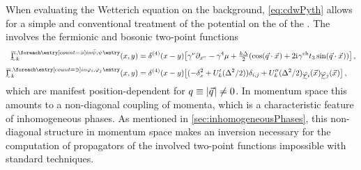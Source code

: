 When evaluating the Wetterich equation on the \cdw{} background, \cref{eq:cdwPyth} allows for a simple and conventional treatment of the \lpa{} potential on the \rhs{} of the \frgEquation{}.
The \rhs{} involves the fermionic and bosonic two-point functions
\begin{align}
	\FSvertexArg{\FSeaaEoMI}{\MFpsib, \MFpsi}(x,y)&=\delta^{(4)}(x-y)\big[\gamma^\nu\partial_{x^\nu}-\gamma^4\mu +\tfrac{h \Delta}{2}(\cos(\vec{q}\cdot\vec{x}\vts) +2\iu  \gammach t_3 \sin(\vec{q}\cdot\vec{x}\vts))\big]\, ,\label{eq:cdwGF}\\[.4em]
	\FSvertexArg{\FSeaaEoMI}{\MFphi_i, \MFphi_j}(x,y)&=\delta^{(4)}(x-y)\big[(-\delta_x^2+U'_k(\Delta^2/2))\delta_{i,j}+U''_k(\Delta^2/2) \MFEIphi_i(\vec{x}\vts) \MFEIphi_j(\vec{x}\vts)\big]\, ,\label{eq:cdwGB}
\end{align}
which are manifest position-dependent for $q\equiv |\vec{q}\mskip1.0mu|\neq 0 $.
In momentum space this amounts to a non-diagonal coupling of momenta, which is a characteristic feature of inhomogeneous phases. As mentioned in \cref{sec:inhomogeneousPhases}, this non-diagonal structure in momentum space makes an inversion \dash{} necessary for the computation of propagators \dash{} of the involved two-point functions impossible with standard techniques.

